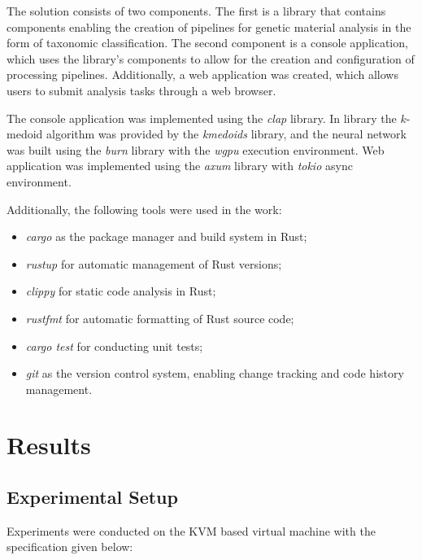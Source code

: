 \documentclass[pdflatex,sn-vancouver-num]{sn-jnl}%
\begin{document}
            The solution consists of two components. The first is a library that contains components enabling the creation of pipelines for genetic material analysis in the form of taxonomic classification. The second component is a console application, which uses the library's components to allow for the creation and configuration of processing pipelines. Additionally, a web application was created, which allows users to submit analysis tasks through a web browser.  

            The console application was implemented using the \textit{clap} library\cite{Rust:clap}. In library the $k$-medoid algorithm was provided by the \textit{kmedoids} library\cite{Rust:kmedoids}, and the neural network was built using the \textit{burn} library\cite{Rust:burn} with the \textit{wgpu} execution environment. Web application was implemented using the \textit{axum} library\cite{Rust:axum} with \textit{tokio}\cite{Rust:axum} async environment.
                
            Additionally, the following tools were used in the work:
            \begin{itemize}
                \item \textit{cargo} as the package manager and build system in Rust;
                \item \textit{rustup} for automatic management of Rust versions;
                \item \textit{clippy} for static code analysis in Rust;
                \item \textit{rustfmt} for automatic formatting of Rust source code;
                \item \textit{cargo test} for conducting unit tests;
                \item \textit{git} as the version control system, enabling change tracking and code history management.
            \end{itemize}

    \section{Results}

        \subsection{Experimental Setup}
            Experiments were conducted on the KVM based virtual machine with the specification given below:
\end{document}
